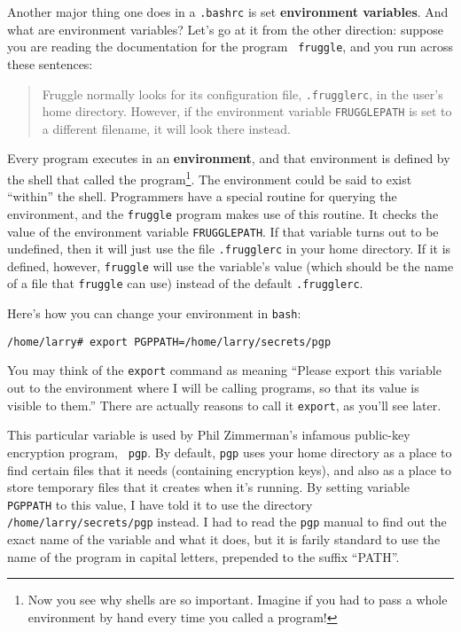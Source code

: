 Another major thing one does in a {\tt .bashrc} is set {\bf
  environment variables}.  And what are
environment variables?  Let's go at it from the other direction:
suppose you are reading the documentation for the program {\tt
  fruggle}, and you run across these sentences:

\begin{quote}
  Fruggle normally looks for its configuration file, {\tt .frugglerc},
  in the user's home directory.  However, if the environment variable
  {\tt FRUGGLEPATH} is set to a different filename, it will look there
  instead.
\end{quote}

Every program executes in an {\bf environment}, and
that environment is defined by the shell that called the
program\footnote{Now you see why shells are so important.  Imagine if
  you had to pass a whole environment by hand every time you called a
  program!}.  The environment could be said to exist ``within'' the
shell.  Programmers have a special routine for querying the
environment, and the {\tt fruggle} program makes use of this routine.
It checks the value of the environment variable {\tt FRUGGLEPATH}.  If
that variable turns out to be undefined, then it will just use the
file {\tt .frugglerc} in your home directory.  If it is defined,
however, {\tt fruggle} will use the variable's value (which should
be the name of a file that {\tt fruggle} can use) instead of the
default {\tt .frugglerc}.

Here's how you can change your environment in {\tt bash}:

\begin{screen}\begin{verbatim}
/home/larry# export PGPPATH=/home/larry/secrets/pgp
\end{verbatim}\end{screen}

        You may think of the {\tt export} command as meaning ``Please
export this variable out to the environment where I will be calling
programs, so that its value is visible to them.''  There are actually
reasons to call it {\tt export}, as you'll see later.

This particular variable is used by Phil Zimmerman's infamous public-key encryption program, {\tt
  pgp}.  By default, {\tt pgp} uses your home directory
as a place to find certain files that it needs (containing encryption
keys), and also as a place to store temporary files that it creates
when it's running.  By setting variable {\tt PGPPATH} to this value, I
have told it to use the directory {\tt /home/larry/secrets/pgp}
instead. I had to read the {\tt pgp} manual to find out the exact name
of the variable and what it does, but it is farily standard to use the
name of the program in capital letters, prepended to the suffix
``PATH''.

